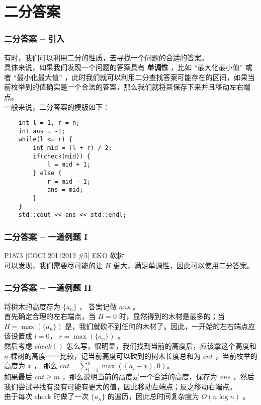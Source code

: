 \documentclass{beamer}
\newcommand{\fdf}[1]{\alert{\textbf{#1}}}
\begin{document}
\section{二分答案}
\begin{frame}[fragile]
\frametitle{二分答案 -- 引入}
有时，我们可以利用二分的性质，去寻找一个问题的合适的答案。\\ 
具体来说，如果我们发现一个问题的答案具有 \fdf{单调性} ，比如 “最大化最小值” 或者 “最小化最大值” ，此时我们就可以利用二分查找答案可能存在的区间，如果当前枚举到的值确实是一个合法的答案，那么我们就将其保存下来并且移动左右端点。 \\ 
一般来说，二分答案的模版如下：
\begin{onlyenv}
\begin{verbatim}
    int l = 1, r = n;
    int ans = -1;
    while(l <= r) {
        int mid = (l + r) / 2;
        if(check(mid)) {
            l = mid + 1;
        } else {
            r = mid - 1;
            ans = mid;
        }
    }
    std::cout << ans << std::endl;
\end{verbatim}
\end{onlyenv}
\end{frame}
\begin{frame}
\frametitle{二分答案 -- 一道例题 I}
P1873 [COCI 2011\/2012 \#5] EKO \/ 砍树 \\ 
可以发现，我们需要尽可能的让 $H$ 更大，满足单调性，因此可以使用二分答案。 \\ 
\end{frame}
\begin{frame}
\frametitle{二分答案 -- 一道例题 II}
将树木的高度存为 $\{a_n\}$ ， 答案记做 $ans$ 。 \\
首先确定合理的左右端点，当 $H = 0$ 时，显然得到的木材是最多的；当 $H = \max(\{a_n\})$ 是，我们就砍不到任何的木材了。因此，一开始的左右端点应该设置成 $l = 0$， $r = \max(\{a_n\})$ 。 \\ 
然后考虑 $check()$ 怎么写，很明显，我们找到当前的高度后，应该拿这个高度和 $n$ 棵树的高度一一比较，记当前高度可以砍到的树木长度总和为 $cnt$ ，当前枚举的高度为 $x$ ， 那么 $cnt = \sum_{i = 1}^{n} \max((a_i - x), 0)$。 \\ 
如果最后 $cnt \geq m$ ，那么说明当前的高度是一个合适的高度，保存为 $ans$ ，然后我们尝试寻找有没有可能有更大的值，因此移动左端点；反之移动右端点。 \\ 
由于每次 check 时做了一次 $\{a_n\}$ 的遍历，因此总时间复杂度为 $O(n\log n)$ 。
\end{frame}
\end{document}
